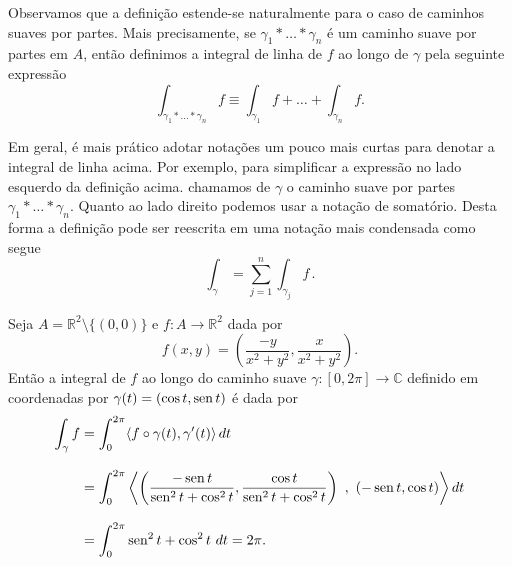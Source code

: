 Observamos  que a definição estende-se naturalmente para o caso de caminhos suaves por partes.
Mais precisamente, se $\gamma_1*\ldots*\gamma_n$ é um caminho suave por partes em $A$, 
então definimos a integral de linha de $f$ ao longo de $\gamma$ pela seguinte expressão
\[
\int_{\gamma_1*\ldots*\gamma_n} f
\equiv 
\int_{\gamma_1}f +\ldots+\int_{\gamma_n}f.
\]

Em geral, é mais prático adotar notações um pouco mais curtas para denotar a integral de linha 
acima. Por exemplo, para simplificar a expressão no lado esquerdo 
da definição acima. chamamos de $\gamma$ o caminho suave por partes $\gamma_1*\ldots*\gamma_n$. 
Quanto ao lado direito podemos usar a notação de somatório. Desta 
forma a definição pode ser reescrita em uma notação mais condensada como segue
\[
\int_{\gamma} = \sum_{j=1}^n \int_{\gamma_j}f\, .
\]


\begin{exemplo}
Seja $A=\mathbb{R}^2\setminus\{(0,0)\}$ e $f:A\to\mathbb{R}^2$ dada por 
\[
f(x,y) = \left( \frac{-y}{x^2+y^2},\frac{x}{x^2+y^2} \right).
\]
Então a integral de $f$ ao longo do caminho suave $\gamma:[0,2\pi]\to \mathbb{C}$
definido em coordenadas por $\gamma(t)=(\cos t,\operatorname{sen} t)$ é dada por 
\begin{align*}
\int_{\gamma} f
&=
\int_{0}^{2\pi} \langle f\circ\gamma(t),\gamma'(t) \rangle \, dt
\\[0.3cm]
&=
\int_{0}^{2\pi} 
	\left\langle 
		\left( \frac{-\sen t}{\sen^2 t+\cos^2 t}  , \frac{\cos t}{\sen^2 t+\cos^2 t} \right)
		\ , \ 
		(-\sen t,\cos t)    
	\right\rangle 
	dt
\\[0.3cm]
&=
\int_{0}^{2\pi} \sen^2 t+\cos^2 t \  dt
=
2\pi.
\end{align*}
\end{exemplo}


